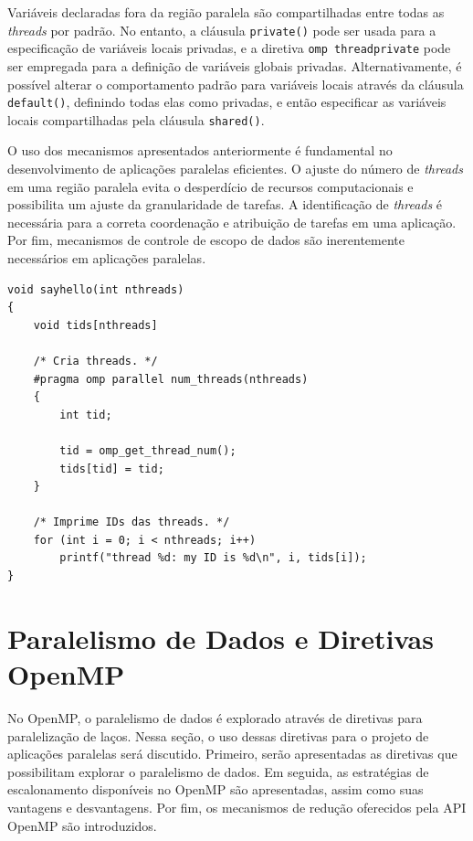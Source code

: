 \documentclass{SBCbookchapter}
\begin{document}
		Variáveis declaradas fora da região paralela são compartilhadas entre
		todas as \textit{threads} por padrão. No entanto, a cláusula \texttt{private()}
		pode ser usada para a especificação de variáveis locais privadas, e a
		diretiva \texttt{omp threadprivate} pode ser empregada para a definição
		de variáveis globais privadas. Alternativamente, é possível alterar o
		comportamento padrão para variáveis locais através da cláusula
		\texttt{default()}, definindo todas elas como privadas, e então
		especificar as variáveis locais compartilhadas pela cláusula
		\texttt{shared()}.

		O uso dos mecanismos apresentados anteriormente é fundamental no
		desenvolvimento de aplicações paralelas eficientes. O ajuste do
		número de \textit{threads} em uma região paralela evita o desperdício de
		recursos computacionais e possibilita um ajuste da granularidade de
		tarefas. A identificação de \textit{threads} é necessária para a correta
		coordenação e atribuição de tarefas em uma aplicação. Por fim,
		mecanismos de controle de escopo de dados são inerentemente
		necessários em aplicações paralelas.

\begin{lstlisting}[frame=single, caption=Um exemplo simples com uma região paralela.,
label=listing:sayhello]
void sayhello(int nthreads)
{
	void tids[nthreads]

	/* Cria threads. */
	#pragma omp parallel num_threads(nthreads)
	{
		int tid;

		tid = omp_get_thread_num();
		tids[tid] = tid;
	}

	/* Imprime IDs das threads. */
	for (int i = 0; i < nthreads; i++)
		printf("thread %d: my ID is %d\n", i, tids[i]);
}
\end{lstlisting}

\section{Paralelismo de Dados e Diretivas OpenMP}

	No OpenMP, o paralelismo de dados é explorado através de diretivas
	para paralelização de laços. Nessa seção, o uso dessas diretivas para o
	projeto de aplicações paralelas será discutido.
	Primeiro, serão apresentadas as diretivas que possibilitam explorar o
	paralelismo de dados. Em seguida, as estratégias de escalonamento
	disponíveis no OpenMP são apresentadas, assim como suas vantagens e
	desvantagens. Por fim, os mecanismos de redução oferecidos pela API
	OpenMP são introduzidos.
\end{document}
